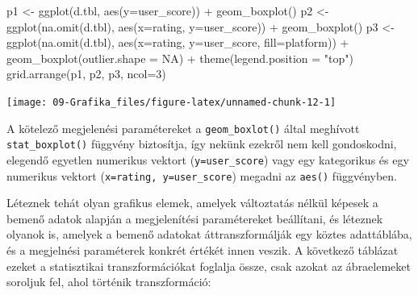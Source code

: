 \documentclass[
]{book}
\newenvironment{Shaded}{\begin{snugshade}}{\end{snugshade}}
\newcommand{\AttributeTok}[1]{\textcolor[rgb]{0.77,0.63,0.00}{#1}}
\newcommand{\ConstantTok}[1]{\textcolor[rgb]{0.00,0.00,0.00}{#1}}
\newcommand{\DecValTok}[1]{\textcolor[rgb]{0.00,0.00,0.81}{#1}}
\newcommand{\FunctionTok}[1]{\textcolor[rgb]{0.00,0.00,0.00}{#1}}
\newcommand{\NormalTok}[1]{#1}
\newcommand{\OtherTok}[1]{\textcolor[rgb]{0.56,0.35,0.01}{#1}}
\newcommand{\SpecialCharTok}[1]{\textcolor[rgb]{0.00,0.00,0.00}{#1}}
\newcommand{\StringTok}[1]{\textcolor[rgb]{0.31,0.60,0.02}{#1}}
\begin{document}
\begin{Shaded}
\begin{Highlighting}[]
\NormalTok{p1 }\OtherTok{\textless{}{-}} \FunctionTok{ggplot}\NormalTok{(d.tbl, }\FunctionTok{aes}\NormalTok{(}\AttributeTok{y=}\NormalTok{user\_score)) }\SpecialCharTok{+} \FunctionTok{geom\_boxplot}\NormalTok{() }
\NormalTok{p2 }\OtherTok{\textless{}{-}} \FunctionTok{ggplot}\NormalTok{(}\FunctionTok{na.omit}\NormalTok{(d.tbl), }\FunctionTok{aes}\NormalTok{(}\AttributeTok{x=}\NormalTok{rating, }\AttributeTok{y=}\NormalTok{user\_score)) }\SpecialCharTok{+} \FunctionTok{geom\_boxplot}\NormalTok{()}
\NormalTok{p3 }\OtherTok{\textless{}{-}} \FunctionTok{ggplot}\NormalTok{(}\FunctionTok{na.omit}\NormalTok{(d.tbl), }\FunctionTok{aes}\NormalTok{(}\AttributeTok{x=}\NormalTok{rating, }\AttributeTok{y=}\NormalTok{user\_score, }\AttributeTok{fill=}\NormalTok{platform)) }\SpecialCharTok{+} \FunctionTok{geom\_boxplot}\NormalTok{(}\AttributeTok{outlier.shape =} \ConstantTok{NA}\NormalTok{) }\SpecialCharTok{+} \FunctionTok{theme}\NormalTok{(}\AttributeTok{legend.position =} \StringTok{"top"}\NormalTok{)}
\FunctionTok{grid.arrange}\NormalTok{(p1, p2, p3, }\AttributeTok{ncol=}\DecValTok{3}\NormalTok{)}
\end{Highlighting}
\end{Shaded}

\begin{center}\texttt{[image: 09-Grafika\_files/figure-latex/unnamed-chunk-12-1]} \end{center}

A kötelező megjelenési paramétereket a \texttt{geom\_boxlot()} által meghívott \texttt{stat\_boxplot()} függvény biztosítja, így nekünk ezekről nem kell gondoskodni, elegendő egyetlen numerikus vektort (\texttt{y=user\_score}) vagy egy kategorikus és egy numerikus vektort (\texttt{x=rating,\ y=user\_score}) megadni az \texttt{aes()} függvényben.

Léteznek tehát olyan grafikus elemek, amelyek változtatás nélkül képesek a bemenő adatok alapján a megjelenítési paramétereket beállítani, és léteznek olyanok is, amelyek a bemenő adatokat áttranszformálják egy köztes adattáblába, és a megjelnési paraméterek konkrét értékét innen veszik. A következő táblázat ezeket a statisztikai transzformációkat foglalja össze, csak azokat az ábraelemeket soroljuk fel, ahol történik transzformáció:
\end{document}
